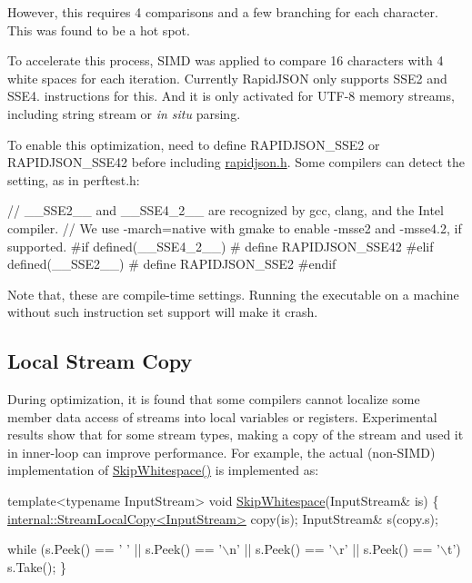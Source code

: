 However, this requires 4 comparisons and a few branching for each character. This was found to be a hot spot.

To accelerate this process, S\+I\+MD was applied to compare 16 characters with 4 white spaces for each iteration. Currently Rapid\+J\+S\+ON only supports S\+S\+E2 and S\+S\+E4. instructions for this. And it is only activated for U\+T\+F-\/8 memory streams, including string stream or {\itshape in situ} parsing.

To enable this optimization, need to define {\ttfamily R\+A\+P\+I\+D\+J\+S\+O\+N\+\_\+\+S\+S\+E2} or {\ttfamily R\+A\+P\+I\+D\+J\+S\+O\+N\+\_\+\+S\+S\+E42} before including {\ttfamily \hyperlink{rapidjson_8h}{rapidjson.\+h}}. Some compilers can detect the setting, as in {\ttfamily perftest.\+h}\+:


\begin{DoxyCode}
\textcolor{comment}{// \_\_SSE2\_\_ and \_\_SSE4\_2\_\_ are recognized by gcc, clang, and the Intel compiler.}
\textcolor{comment}{// We use -march=native with gmake to enable -msse2 and -msse4.2, if supported.}
\textcolor{preprocessor}{#if defined(\_\_SSE4\_2\_\_)}
\textcolor{preprocessor}{#  define RAPIDJSON\_SSE42}
\textcolor{preprocessor}{#elif defined(\_\_SSE2\_\_)}
\textcolor{preprocessor}{#  define RAPIDJSON\_SSE2}
\textcolor{preprocessor}{#endif}
\end{DoxyCode}


Note that, these are compile-\/time settings. Running the executable on a machine without such instruction set support will make it crash.\hypertarget{md_Cadriciel_Commun_Externe_RapidJSON_doc_internals_LocalStreamCopy}{}\subsection{Local Stream Copy}\label{md_Cadriciel_Commun_Externe_RapidJSON_doc_internals_LocalStreamCopy}
During optimization, it is found that some compilers cannot localize some member data access of streams into local variables or registers. Experimental results show that for some stream types, making a copy of the stream and used it in inner-\/loop can improve performance. For example, the actual (non-\/\+S\+I\+MD) implementation of {\ttfamily \hyperlink{reader_8h_a60338858b2582eca23f3e509a2d82e0e}{Skip\+Whitespace()}} is implemented as\+:


\begin{DoxyCode}
\textcolor{keyword}{template}<\textcolor{keyword}{typename} InputStream>
\textcolor{keywordtype}{void} \hyperlink{reader_8h_a60338858b2582eca23f3e509a2d82e0e}{SkipWhitespace}(InputStream& is) \{
    \hyperlink{classinternal_1_1_stream_local_copy}{internal::StreamLocalCopy<InputStream>} copy(is);
    InputStream& s(copy.s);

    \textcolor{keywordflow}{while} (s.Peek() == \textcolor{charliteral}{' '} || s.Peek() == \textcolor{charliteral}{'\(\backslash\)n'} || s.Peek() == \textcolor{charliteral}{'\(\backslash\)r'} || s.Peek() == \textcolor{charliteral}{'\(\backslash\)t'})
        s.Take();
\}
\end{DoxyCode}


